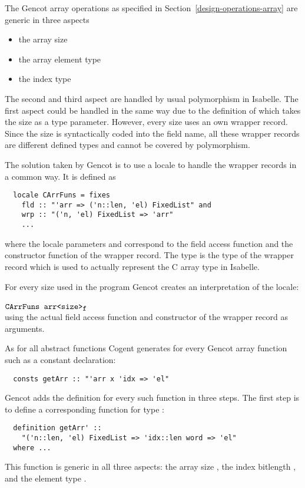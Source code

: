 The Gencot array operations as specified in Section~\ref{design-operations-array} are generic in three aspects
\begin{itemize}
\item the array size
\item the array element type
\item the index type
\end{itemize}
The second and third aspect are handled by usual polymorphism in Isabelle. The first aspect could be handled in the 
same way due to the definition of  which takes the size as a type parameter. However, every size 
uses an own wrapper record. Since the size is syntactically coded into the field name, all these wrapper records
are different defined types and cannot be covered by polymorphism.

The solution taken by Gencot is to use a locale  to handle the wrapper records in a common way. It
is defined as
\begin{verbatim}
  locale CArrFuns = fixes 
    fld :: "'arr => ('n::len, 'el) FixedList" and 
    wrp :: "('n, 'el) FixedList => 'arr"
    ...
\end{verbatim}
where the locale parameters  and  correspond to the field access function and the constructor 
function of the wrapper record. The type  is the type of the wrapper record which is used to actually
represent the C array type in Isabelle.

For every size used in the program Gencot creates an interpretation of the locale:\\[1ex]
\hspace*{2ex}\\
\hspace*{4ex}$\textnormal{\texttt{CArrFuns arr<size>}}_{\textnormal{\texttt{\small{f}}}}$ \\[1ex]
using the actual field access function and constructor of the wrapper record as arguments.

As for all abstract functions Cogent generates for every Gencot array function such as  a constant declaration:
\begin{verbatim}
  consts getArr :: "'arr x 'idx => 'el"
\end{verbatim}

Gencot adds the definition for every such function in three steps. The first step is to define a corresponding function
for type :
\begin{verbatim}
  definition getArr' :: 
    "('n::len, 'el) FixedList => 'idx::len word => 'el"
  where ...
\end{verbatim}
This function is generic in all three aspects: the array size , the index bitlength , and the 
element type .

